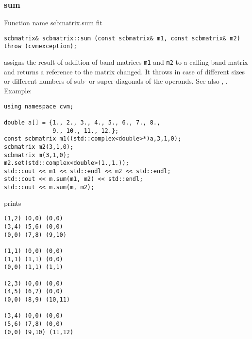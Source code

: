 \subsubsection{sum}
Function%
\pdfdest name {scbmatrix.sum} fit
\begin{verbatim}
scbmatrix& scbmatrix::sum (const scbmatrix& m1, const scbmatrix& m2)
throw (cvmexception);
\end{verbatim}
assigns the result of addition of
band matrices \verb"m1" and \verb"m2"  to a calling band matrix
and returns a reference to
the matrix changed.
It throws  
in case of different sizes or different numbers of sub- or super-diagonals
of the operands.
See also ,
.
Example:
\begin{Verbatim}
using namespace cvm;

double a[] = {1., 2., 3., 4., 5., 6., 7., 8.,
              9., 10., 11., 12.};
const scbmatrix m1((std::complex<double>*)a,3,1,0);
scbmatrix m2(3,1,0);
scbmatrix m(3,1,0);
m2.set(std::complex<double>(1.,1.));
std::cout << m1 << std::endl << m2 << std::endl;
std::cout << m.sum(m1, m2) << std::endl;
std::cout << m.sum(m, m2);
\end{Verbatim}
prints
\begin{Verbatim}
(1,2) (0,0) (0,0)
(3,4) (5,6) (0,0)
(0,0) (7,8) (9,10)

(1,1) (0,0) (0,0)
(1,1) (1,1) (0,0)
(0,0) (1,1) (1,1)

(2,3) (0,0) (0,0)
(4,5) (6,7) (0,0)
(0,0) (8,9) (10,11)

(3,4) (0,0) (0,0)
(5,6) (7,8) (0,0)
(0,0) (9,10) (11,12)
\end{Verbatim}
\newpage



